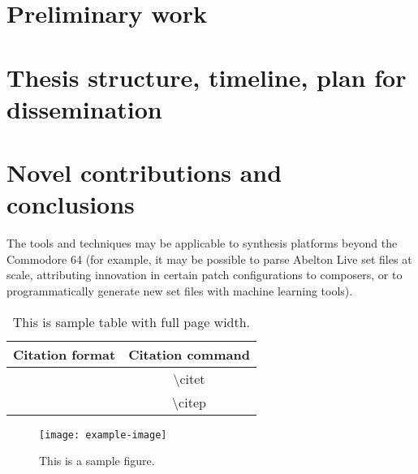 \documentclass[10pt]{article}
\begin{document}
\begin{multicols*}{2}

\section{Preliminary work}

\section{Thesis structure, timeline, plan for dissemination}

\section{Novel contributions and conclusions}

The tools and techniques may be applicable to synthesis platforms
beyond the Commodore 64 (for example, it may be possible to parse
Abelton Live set files at scale, attributing innovation in certain
patch configurations to composers, or to programmatically
generate new set files with machine learning tools).







\begin{table*}
        \centering
        \begin{tabular}{cc}
                \hline
                \textbf{Citation format} & \textbf{Citation command} \\
                \hline
                \citet{APA:83} & \textbackslash{}citet{} \\
                \citep{APA:83} & \textbackslash{}citep{} \\
                \hline
        \end{tabular}
        \caption{This is sample table with full page width.}
        \label{tbl:tbl1}
\end{table*}

\begin{figure}[H]
    \centering
        \texttt{[image: example-image]}
        \caption{This is a sample figure.}
        \label{fig:fig1}
\end{figure}

\end{multicols*}

\clearpage



\end{document}
